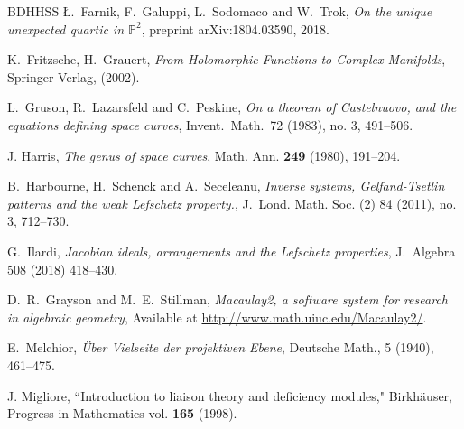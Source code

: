 \documentclass[12pt]{amsart}
\numberwithin{equation}{section}
\theoremstyle{definition}
\newcommand{\PP}{ \ensuremath{\mathbb{P}}}
\begin{document}
\begin{thebibliography}{BDHHSS}
\L.\ Farnik, F.\ Galuppi, L.\ Sodomaco and W.\ Trok,
{\em On the unique unexpected quartic in $\PP^2$}, preprint arXiv:1804.03590, 2018.

K.\ Fritzsche, H.\ Grauert, 
{\em From Holomorphic Functions to Complex Manifolds}, Springer-Verlag, (2002). 


L.\ Gruson, R.\ Lazarsfeld and C.\ Peskine, {\em On a theorem of Castelnuovo, and the equations defining space curves}, 
Invent.\ Math.\ 72 (1983), no. 3, 491--506. 


J. Harris, {\em The genus of space curves}, Math. Ann. {\bf 249} (1980), 191--204.


B.\  Harbourne, H.\ Schenck and A.\ Seceleanu, {\em  Inverse systems, Gelfand-Tsetlin patterns 
and the weak Lefschetz property.}, J.\ Lond. Math. Soc. (2) 84 (2011), no. 3, 712--730.

G.\ Ilardi, {\em Jacobian ideals, arrangements and the Lefschetz properties}, 
J.\ Algebra 508 (2018) 418--430. 


D.\ R.\ Grayson and M.\ E.\ Stillman, 
{\em Macaulay2, a software system for research in algebraic geometry},
Available at \url{http://www.math.uiuc.edu/Macaulay2/}. 

E.\ Melchior, {\em \"Uber Vielseite der projektiven Ebene}, Deutsche Math., 5 (1940),
461--475.

J. Migliore, ``Introduction to liaison theory and deficiency modules," Birkh\"auser, 
Progress in Mathematics vol. {\bf 165} (1998).


\end{thebibliography}
\end{document}
